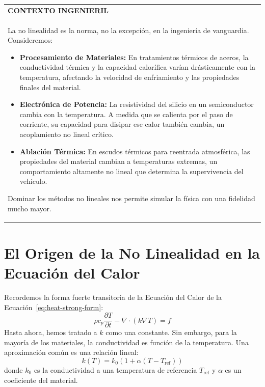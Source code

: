 \begin{center}
\begin{tabular}{|p{}|}
\hline
\textbf{CONTEXTO INGENIERIL} \\
La no linealidad es la norma, no la excepción, en la ingeniería de vanguardia. Consideremos:
\begin{itemize}
    \item \textbf{Procesamiento de Materiales:} En tratamientos térmicos de aceros, la conductividad térmica y la capacidad calorífica varían drásticamente con la temperatura, afectando la velocidad de enfriamiento y las propiedades finales del material.
    \item \textbf{Electrónica de Potencia:} La resistividad del silicio en un semiconductor cambia con la temperatura. A medida que se calienta por el paso de corriente, su capacidad para disipar ese calor también cambia, un acoplamiento no lineal crítico.
    \item \textbf{Ablación Térmica:} En escudos térmicos para reentrada atmosférica, las propiedades del material cambian a temperaturas extremas, un comportamiento altamente no lineal que determina la supervivencia del vehículo.
\end{itemize}
Dominar los métodos no lineales nos permite simular la física con una fidelidad mucho mayor. \\
\hline
\end{tabular}
\end{center}

\section{El Origen de la No Linealidad en la Ecuación del Calor}
\label{sec:nonlinear-origin}
Recordemos la forma fuerte transitoria de la Ecuación del Calor de la Ecuación~\eqref{eq:heat-strong-form}:
\[
    \rho c_p \frac{\partial T}{\partial t} - \nabla \cdot (k \nabla T) = f
\]
Hasta ahora, hemos tratado a \(k\) como una constante. Sin embargo, para la mayoría de los materiales, la conductividad es función de la temperatura. Una aproximación común es una relación lineal:
\begin{equation}
    k(T) = k_0 (1 + \alpha (T - T_{\text{ref}}))
    \label{eq:k_of_T}
\end{equation}
donde \(k_0\) es la conductividad a una temperatura de referencia \(T_{\text{ref}}\) y \(\alpha\) es un coeficiente del material.

